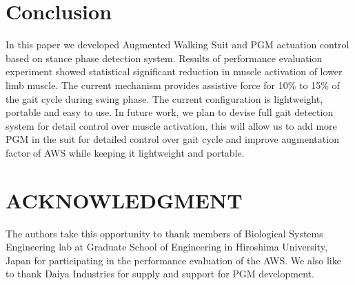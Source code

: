 \documentclass[letterpaper, 10 pt, conference]{ieeeconf}  %
\begin{document}
\section{Conclusion} \label{conclusion}

In this paper we developed Augmented Walking Suit and PGM actuation control based on stance phase detection system. Results of performance evaluation experiment showed statistical significant reduction in muscle activation of lower limb muscle. The current mechanism provides assistive force for 10\% to 15\% of the gait cycle during swing phase. The current configuration is lightweight, portable and easy to use. In future work, we plan to devise full gait detection system for detail control over muscle activation, this will allow us to add more PGM in the suit for detailed control over gait cycle and improve augmentation factor of AWS while keeping it lightweight and portable.









\section*{ACKNOWLEDGMENT}

The authors take this opportunity to thank members of Biological Systems Engineering lab at Graduate School of Engineering in Hiroshima University, Japan for participating in the performance evaluation of the AWS. We also like to thank Daiya Industries for supply and support for PGM development.  
\end{document}
